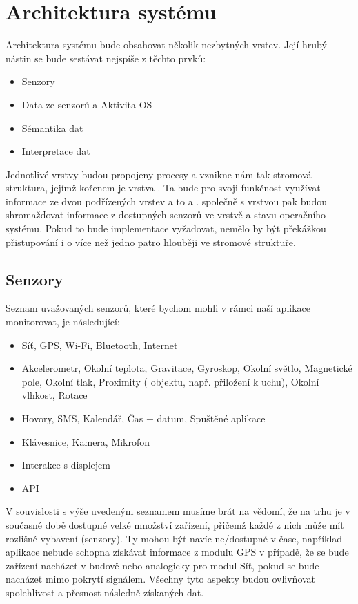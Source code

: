 \documentclass[thesis=M,czech]{FITthesis}[2012/06/26]
\begin{document}
\section{Architektura systému}
Architektura systému bude obsahovat několik nezbytných vrstev. Její hrubý nástin se bude sestávat nejspíše z těchto prvků:

\begin{itemize}
\item    Senzory
\item    Data ze senzorů a Aktivita OS
\item    Sémantika dat
\item    Interpretace dat
\end{itemize}

Jednotlivé vrstvy budou propojeny procesy a vznikne nám tak stromová struktura, jejímž kořenem je vrstva . Ta bude pro svoji funkčnost využívat informace ze dvou podřízených vrstev a to  a .  společně s vrstvou  pak budou shromažďovat informace z dostupných senzorů ve vrstvě  a stavu operačního systému. Pokud to bude implementace vyžadovat, nemělo by být překážkou přistupování i o více než jedno patro hlouběji ve stromové struktuře.

\subsection{Senzory}
Seznam uvažovaných senzorů, které bychom mohli v rámci naší aplikace monitorovat, je následující:

\begin{itemize}
\item    Síť, GPS, Wi-Fi, Bluetooth, Internet
\item    Akcelerometr, Okolní teplota, Gravitace, Gyroskop, Okolní světlo, Magnetické pole, Okolní tlak, Proximity ( objektu, např. přiložení k uchu), Okolní vlhkost, Rotace
\item    Hovory, SMS, Kalendář, Čas + datum, Spuštěné aplikace
\item    Klávesnice, Kamera, Mikrofon
\item    Interakce s displejem
\item    API
\end{itemize}

V souvislosti s výše uvedeným seznamem musíme brát na vědomí, že na trhu je v současné době dostupné velké množství zařízení, přičemž každé z nich může mít rozlišné vybavení (senzory). Ty mohou být navíc ne/dostupné v čase, například aplikace nebude schopna získávat informace z modulu GPS v případě, že se bude zařízení nacházet v budově nebo analogicky pro modul Síť, pokud se bude nacházet mimo pokrytí signálem. Všechny tyto aspekty budou ovlivňovat spolehlivost a přesnost následně získaných dat.
\end{document}
